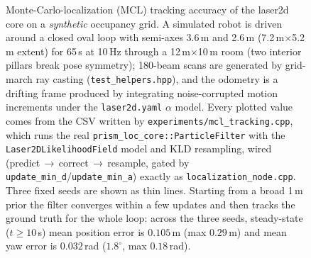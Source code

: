 \begin{figure}[t]
  \caption{Monte-Carlo-localization (MCL) tracking accuracy of the laser2d core on
    a \emph{synthetic} occupancy grid. A simulated robot is driven around a closed
    oval loop with semi-axes 3.6\,m and 2.6\,m (7.2\,m$\times$5.2\,m extent)
    for 65\,s at 10\,Hz through a 12\,m$\times$10\,m
    room (two interior pillars break pose symmetry); 180-beam scans are generated by
    grid-march ray casting (\texttt{test\_helpers.hpp}), and the odometry is a
    drifting frame produced by integrating noise-corrupted motion increments under
    the \texttt{laser2d.yaml} $\alpha$ model. Every plotted value comes from the CSV
    written by \texttt{experiments/mcl\_tracking.cpp}, which runs the real
    \texttt{prism\_loc\_core::ParticleFilter} with the \texttt{Laser2DLikelihoodField}
    model and KLD resampling, wired (predict\,$\to$\,correct\,$\to$\,resample, gated by
    \texttt{update\_min\_d}/\texttt{update\_min\_a}) exactly as \texttt{localization\_node.cpp}.
    Three fixed seeds are shown as thin lines. Starting from a broad 1\,m prior the
    filter converges within a few updates and then tracks the ground truth for the
    whole loop: across the three seeds, steady-state ($t\ge10\,$s) mean position error
    is $0.105\,$m (max $0.29\,$m) and mean yaw error is $0.032\,$rad ($1.8^{\circ}$,
    max $0.18\,$rad).}
  \label{fig:mcl}
\end{figure}
